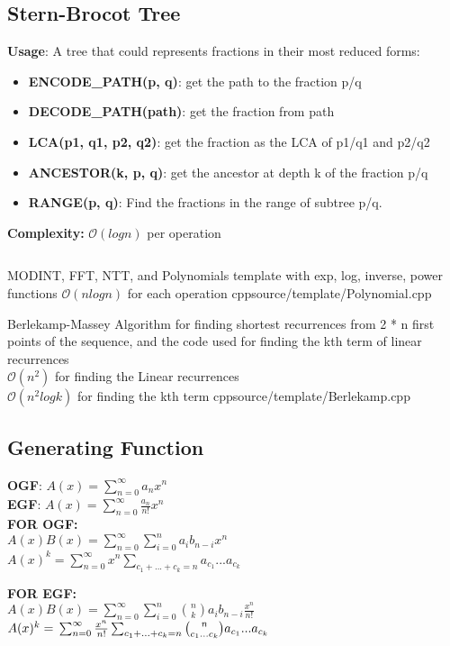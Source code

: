 \subsection{Stern-Brocot Tree}
\textbf{Usage}: A tree that could represents fractions in their most reduced forms:
\begin{itemize}
    \item \textbf{ENCODE\_PATH(p, q)}: get the path to the fraction p/q
    \item \textbf{DECODE\_PATH(path)}: get the fraction from path
    \item \textbf{LCA(p1, q1, p2, q2)}: get the fraction as the LCA of p1/q1 and p2/q2
    \item \textbf{ANCESTOR(k, p, q)}: get the ancestor at depth k of the fraction p/q
    \item \textbf{RANGE(p, q)}: Find the fractions in the range of subtree p/q.
\end{itemize}
\textbf{Complexity: }$\mathcal{O}(log n)$ per operation
\inputminted[]{cpp}{source/template/SternBrocot.cpp}


{MODINT, FFT, NTT, and Polynomials template with exp, log, inverse, power functions}
{$\mathcal{O}(n log n)$ for each operation}
{cpp}{source/template/Polynomial.cpp}


{Berlekamp-Massey Algorithm for finding shortest recurrences from 2 * n first points of the sequence, and the code used for finding the kth term of linear recurrences}
{\\ $\mathcal{O}(n^2)$ for finding the Linear recurrences
 \\ $\mathcal{O}(n ^2 log k)$ for finding the kth term}
{cpp}{source/template/Berlekamp.cpp}


\subsection{Generating Function}
\textbf{OGF}: $A(x) =\sum_{n=0}^\infty a_nx^n$ \\

 \textbf{EGF}: $A(x) =\sum_{n=0}^\infty \frac{a_n}{n!} x^n$ \\ 
 
 \textbf{FOR OGF: } \\
$A(x)B(x) = \sum_{n=0}^\infty \sum_{i=0}^na_{i}b_{n-i}x^n$ \\
$A(x)^k = \sum_{n=0}^\infty x^n\sum_{c_1+...+c_k =n}a_{c_1}...a_{c_k}$


\textbf{FOR EGF: } \\
$A(x)B(x) = \sum_{n=0}^\infty \sum_{i=0}^n\binom{n}{k}a_{i}b_{n-i}\frac{x^n}{n!}$ \\
$A(x)^k = \\ \sum_{n=0}^\infty \frac{x^n}{n!}\sum_{c_1+...+c_k =n}\binom{n}{c_1...c_k}a_{c_1}...a_{c_k}$


